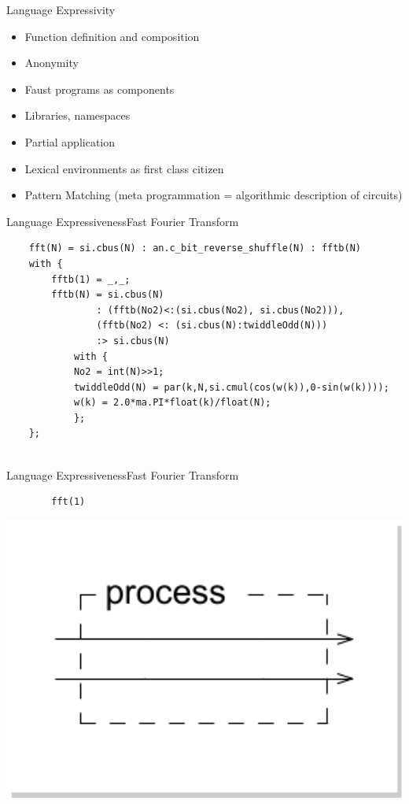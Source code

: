 
\begin{frame}[fragile]{Language Expressivity}
    \begin{itemize}
        \item Function definition and composition
        \item Anonymity
        \item Faust programs as components
        \item Libraries, namespaces
        \item Partial application
        \item Lexical environments as first class citizen
        \item Pattern Matching (meta programmation = algorithmic description of circuits)
    \end{itemize}
\end{frame}


\begin{frame}[fragile,shrink=30]{Language Expressiveness}{Fast Fourier Transform}
    \vspace{1cm}
    \begin{lstlisting}
    fft(N) = si.cbus(N) : an.c_bit_reverse_shuffle(N) : fftb(N)
    with {
        fftb(1) = _,_;
        fftb(N) = si.cbus(N)
                : (fftb(No2)<:(si.cbus(No2), si.cbus(No2))),
                (fftb(No2) <: (si.cbus(N):twiddleOdd(N)))
                :> si.cbus(N)
            with {
            No2 = int(N)>>1;
            twiddleOdd(N) = par(k,N,si.cmul(cos(w(k)),0-sin(w(k))));
            w(k) = 2.0*ma.PI*float(k)/float(N);
            };
    };
    
    \end{lstlisting}
\end{frame}
        
\begin{frame}[fragile,shrink=30]{Language Expressiveness}{Fast Fourier Transform}
    \vspace{1cm}
    \begin{lstlisting}
        fft(1)
    \end{lstlisting}

    \begin{center}
        \includegraphics[width=1\textwidth]{images/fft1}
    \end{center}
\end{frame}
 
